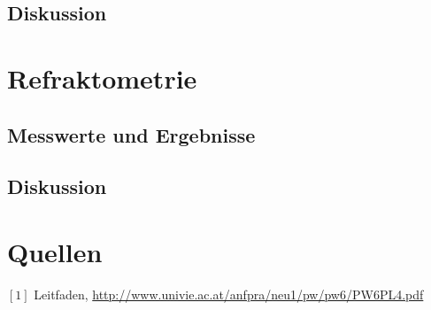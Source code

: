 \documentclass[12pt,a4paper]{article}
\begin{document}
\begin{multicols}{2}
\subsection{Diskussion}


\section{Refraktometrie}

\subsection{Messwerte und Ergebnisse}


\subsection{Diskussion}


\section{Quellen}
$[1]$ Leitfaden, \url{http://www.univie.ac.at/anfpra/neu1/pw/pw6/PW6PL4.pdf}\\

\end{multicols}
\end{document}

